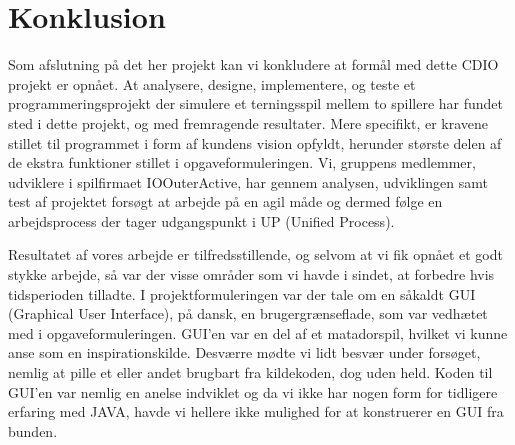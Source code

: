 \chapter{Konklusion}
Som afslutning på det her projekt kan vi konkludere at formål med dette CDIO projekt er opnået. At analysere, designe, implementere, og teste et programmeringsprojekt der simulere et terningsspil mellem to spillere har fundet sted i dette projekt, og med fremragende resultater. Mere specifikt, er kravene stillet til programmet i form af kundens vision opfyldt, herunder største delen af de ekstra funktioner stillet i opgaveformuleringen. Vi, gruppens medlemmer, udviklere i spilfirmaet IOOuterActive, har gennem analysen, udviklingen samt test af projektet forsøgt at arbejde på en agil måde og dermed følge en arbejdsprocess der tager udgangspunkt i UP (Unified Process).

Resultatet af vores arbejde er tilfredsstillende, og selvom at vi fik opnået et godt stykke arbejde, så var der visse områder som vi havde i sindet, at forbedre hvis tidsperioden tilladte. I projektformuleringen var der tale om en såkaldt GUI (Graphical User Interface), på dansk, en brugergrænseflade, som var vedhætet med i opgaveformuleringen. GUI’en var en del af et matadorspil, hvilket vi kunne anse som en inspirationskilde. Desværre mødte vi lidt besvær under forsøget, nemlig at pille et eller andet brugbart fra kildekoden, dog uden held. Koden til GUI’en var nemlig en anelse indviklet og da vi ikke har nogen form for tidligere erfaring med JAVA, havde vi hellere ikke mulighed for at konstruerer en GUI fra bunden.


